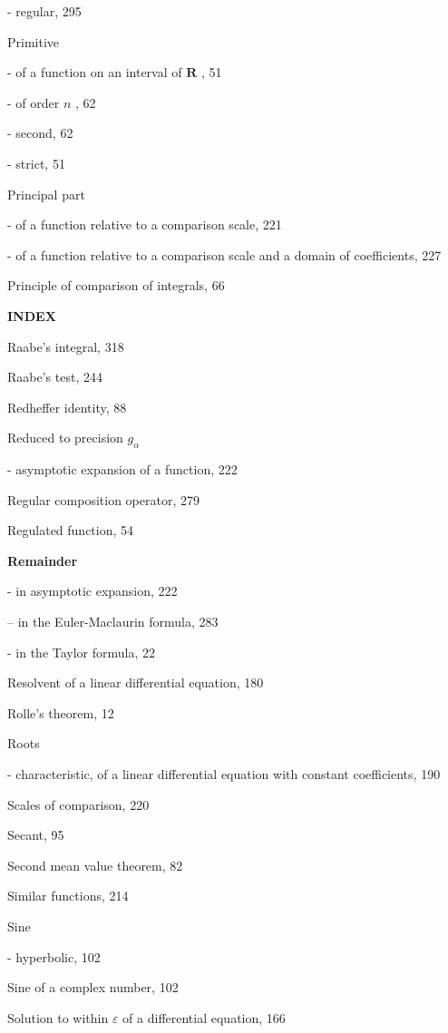 - regular, 295

Primitive

- of a function on an interval of \(\mathbf{R}\) , 51

- of order \(n\) , 62

- second, 62

- strict, 51

Principal part

- of a function relative to a comparison scale, 221

- of a function relative to a comparison scale and a domain of coefficients, 227

Principle of comparison of integrals, 66

\par\noindent\textbf{INDEX}\par

Raabe's integral, 318

Raabe's test, 244

Redheffer identity, 88

Reduced to precision \(g_{\alpha}\)

- asymptotic expansion of a function, 222

Regular composition operator, 279

Regulated function, 54

\par\noindent\textbf{Remainder}\par

- in asymptotic expansion, 222

-- in the Euler-Maclaurin formula, 283

- in the Taylor formula, 22

Resolvent of a linear differential equation, 180

Rolle's theorem, 12

Roots

- characteristic, of a linear differential equation with constant coefficients, 190

Scales of comparison, 220

Secant, 95

Second mean value theorem, 82

Similar functions, 214

Sine

- hyperbolic, 102

Sine of a complex number, 102

Solution to within \(\varepsilon\) of a differential equation, 166


